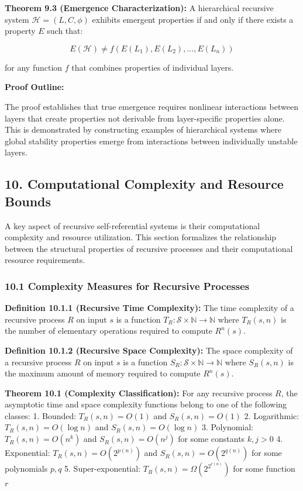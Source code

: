 \documentclass[
]{article}
\begin{document}
\textbf{Theorem 9.3 (Emergence Characterization):} A hierarchical
recursive system \(\mathcal{H} = (L, C, \phi)\) exhibits emergent
properties if and only if there exists a property \(E\) such that:

\[E(\mathcal{H}) \neq f(E(L_1), E(L_2), ..., E(L_n))\]

for any function \(f\) that combines properties of individual layers.

\textbf{Proof Outline:}

The proof establishes that true emergence requires nonlinear
interactions between layers that create properties not derivable from
layer-specific properties alone. This is demonstrated by constructing
examples of hierarchical systems where global stability properties
emerge from interactions between individually unstable layers.

\subsection{10. Computational Complexity and Resource
Bounds}\label{computational-complexity-and-resource-bounds}

A key aspect of recursive self-referential systems is their
computational complexity and resource utilization. This section
formalizes the relationship between the structural properties of
recursive processes and their computational resource requirements.

\subsubsection{10.1 Complexity Measures for Recursive
Processes}\label{complexity-measures-for-recursive-processes}

\textbf{Definition 10.1.1 (Recursive Time Complexity):} The time
complexity of a recursive process \(R\) on input \(s\) is a function
\(T_R: \mathcal{S} \times \mathbb{N} \rightarrow \mathbb{N}\) where
\(T_R(s, n)\) is the number of elementary operations required to compute
\(R^n(s)\).

\textbf{Definition 10.1.2 (Recursive Space Complexity):} The space
complexity of a recursive process \(R\) on input \(s\) is a function
\(S_R: \mathcal{S} \times \mathbb{N} \rightarrow \mathbb{N}\) where
\(S_R(s, n)\) is the maximum amount of memory required to compute
\(R^n(s)\).

\textbf{Theorem 10.1 (Complexity Classification):} For any recursive
process \(R\), the asymptotic time and space complexity functions belong
to one of the following classes: 1. Bounded: \(T_R(s, n) = O(1)\) and
\(S_R(s, n) = O(1)\) 2. Logarithmic: \(T_R(s, n) = O(\log n)\) and
\(S_R(s, n) = O(\log n)\) 3. Polynomial: \(T_R(s, n) = O(n^k)\) and
\(S_R(s, n) = O(n^j)\) for some constants \(k, j > 0\) 4. Exponential:
\(T_R(s, n) = O(2^{p(n)})\) and \(S_R(s, n) = O(2^{q(n)})\) for some
polynomials \(p, q\) 5. Super-exponential:
\(T_R(s, n) = \Omega(2^{2^{r(n)}})\) for some function \(r\)
\end{document}
